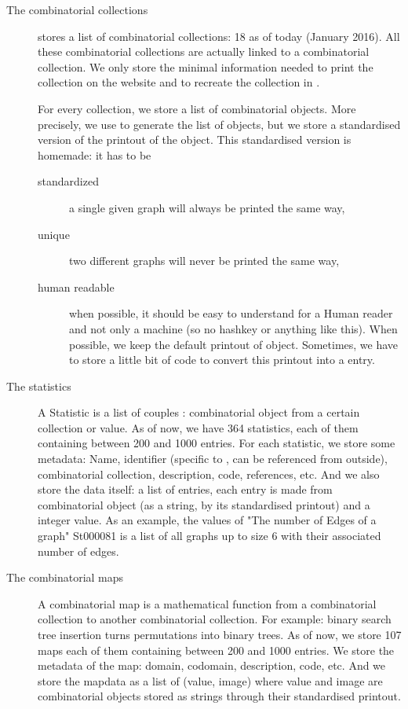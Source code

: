 \begin{description}
\item[The combinatorial collections] \FindStat stores a list of combinatorial collections: 18 as of today (January 2016). All these combinatorial collections are actually linked to a \SageMath combinatorial collection. We only store the minimal  information needed to print the collection on the website and to recreate the collection in \SageMath.

For every collection, we store a list of combinatorial objects. More precisely, we use \SageMath to generate the list of objects,
but we store a standardised version of the printout of the object. This standardised version is homemade: it has to be
\begin{description}
\item[standardized] a single given graph will always be printed the same way,
\item[unique] two different graphs will never be printed the same way,
\item[human readable] when possible, it should be easy to understand for a Human reader and not only a machine (so no hashkey or anything like this).
When possible, we keep the default printout of \SageMath object. Sometimes, we have to store a little bit of code to convert this printout into a
\SageMath entry.
\end{description}

\item[The statistics] A Statistic is a list of couples : combinatorial object from a certain collection or value. As of now, we have 364 statistics,
each of them containing between 200 and 1000 entries. For each statistic, we store some metadata: Name, identifier
(specific to \FindStat, can be referenced from outside), combinatorial collection, description, code, references, etc. And we also store the data itself: a list of entries,
each entry is made from combinatorial object (as a string, by its standardised printout) and a integer value. As an example, the values of "The number of Edges of a graph"
St000081 is a list of all graphs up to size 6 with their associated number of edges.

\item[The combinatorial maps] A combinatorial map is a mathematical function from a combinatorial collection to another combinatorial collection. For example: binary search
tree insertion turns permutations into binary trees. As of now, we store 107 maps each of them containing between 200 and 1000 entries. We store the metadata of the map: domain, codomain, description, code, etc. And we store the mapdata as a list of (value, image)
where value and image are combinatorial objects stored as strings through their standardised printout.
\end{description}

